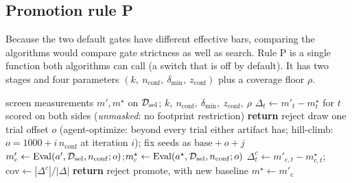 \subsection{Promotion rule P}
\label{sec:method:P}

Because the two default gates have different effective bars, comparing the algorithms would compare gate strictness as
well as search. Rule P is a single function both algorithms can call (a switch that is off by default). It has two stages and four parameters
$(k,\ n_{\mathrm{conf}},\ \delta_{\min},\ z_{\mathrm{conf}})$ plus a coverage floor $\rho$.

\begin{algorithm}[t]
\caption{Promotion rule P for candidate $\artifact'$ against incumbent $\artifact^\star$.}
\label{alg:P}
\begin{algorithmic}[1]
\REQUIRE screen measurements $m',m^\star$ on $\mathcal{D}_{\mathrm{sel}}$; $k,\ n_{\mathrm{conf}},\ \delta_{\min},\ z_{\mathrm{conf}},\ \rho$
\STATE $\Delta_t\gets m'_t-m^\star_t$ for $t$ scored on both sides (\emph{unmasked}: no footprint restriction)
 \STATE \textbf{return} reject \ENDIF
\STATE draw one trial offset $o$ (agent-optimize: beyond every trial either artifact has; hill-climb: $o=1000+i\,n_{\mathrm{conf}}$ at iteration $i$); fix seeds as $\mathrm{base}+o+j$
\STATE $m'_{\mathrm{c}}\gets \mathrm{Eval}(a',\mathcal{D}_{\mathrm{sel}},n_{\mathrm{conf}};o)$;\quad $m^\star_{\mathrm{c}}\gets \mathrm{Eval}(a^\star,\mathcal{D}_{\mathrm{sel}},n_{\mathrm{conf}};o)$
\STATE $\Delta^{c}_t\gets m'_{\mathrm{c},t}-m^\star_{\mathrm{c},t}$;\quad $\mathrm{cov}\gets |\Delta^{c}|/|\Delta|$
 \STATE \textbf{return} reject \ENDIF
\RETURN promote, with new baseline $m^\star\gets m'_{\mathrm{c}}$
\end{algorithmic}
\end{algorithm}

